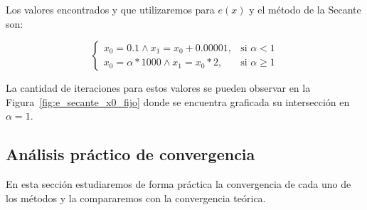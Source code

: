 Los valores encontrados y que utilizaremos para $e(x)$ y el método de la
Secante son:

\[
\begin{cases}
x_0 = 0.1 \wedge x_1 = x_0 + 0.00001, & \mbox{si } \alpha < 1\\
x_0 = \alpha * 1000 \wedge x_1 = x_0 * 2, & \mbox{si } \alpha \ge 1
\end{cases}
\]

La cantidad de iteraciones para estos valores se pueden observar en la
Figura~\ref{fig:e_secante_x0_fijo} donde se encuentra graficada su intersección
en $\alpha = 1$.

\subsection{Análisis práctico de convergencia}

En esta sección estudiaremos de forma práctica la convergencia de cada uno de
los métodos y la compararemos con la convergencia teórica.
